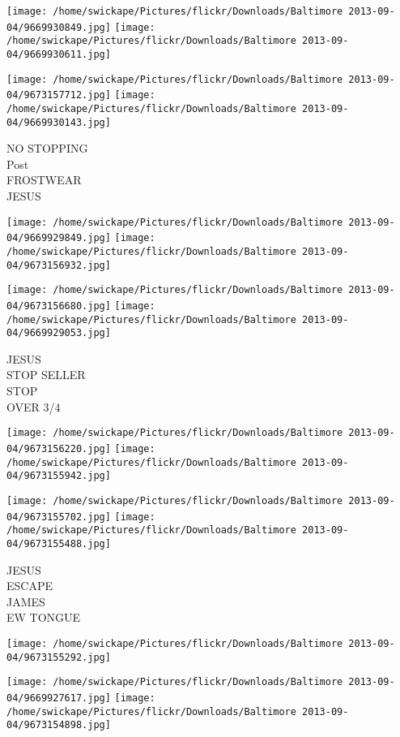 \documentclass[10pt,letterpaper]{article}
\begin{document}
\texttt{[image: /home/swickape/Pictures/flickr/Downloads/Baltimore 2013-09-04/9669930849.jpg]}
\texttt{[image: /home/swickape/Pictures/flickr/Downloads/Baltimore 2013-09-04/9669930611.jpg]}

\texttt{[image: /home/swickape/Pictures/flickr/Downloads/Baltimore 2013-09-04/9673157712.jpg]}
\texttt{[image: /home/swickape/Pictures/flickr/Downloads/Baltimore 2013-09-04/9669930143.jpg]}

NO STOPPING\\
Post\\
FROSTWEAR\\
JESUS
\pagebreak

\texttt{[image: /home/swickape/Pictures/flickr/Downloads/Baltimore 2013-09-04/9669929849.jpg]}
\texttt{[image: /home/swickape/Pictures/flickr/Downloads/Baltimore 2013-09-04/9673156932.jpg]}

\texttt{[image: /home/swickape/Pictures/flickr/Downloads/Baltimore 2013-09-04/9673156680.jpg]}
\texttt{[image: /home/swickape/Pictures/flickr/Downloads/Baltimore 2013-09-04/9669929053.jpg]}

JESUS\\
STOP SELLER\\
STOP\\
OVER 3/4
\pagebreak

\texttt{[image: /home/swickape/Pictures/flickr/Downloads/Baltimore 2013-09-04/9673156220.jpg]}
\texttt{[image: /home/swickape/Pictures/flickr/Downloads/Baltimore 2013-09-04/9673155942.jpg]}

\texttt{[image: /home/swickape/Pictures/flickr/Downloads/Baltimore 2013-09-04/9673155702.jpg]}
\texttt{[image: /home/swickape/Pictures/flickr/Downloads/Baltimore 2013-09-04/9673155488.jpg]}

JESUS\\
ESCAPE\\
JAMES\\
EW TONGUE
\pagebreak

\texttt{[image: /home/swickape/Pictures/flickr/Downloads/Baltimore 2013-09-04/9673155292.jpg]}

\vspace{0.25in}
\texttt{[image: /home/swickape/Pictures/flickr/Downloads/Baltimore 2013-09-04/9669927617.jpg]}
\texttt{[image: /home/swickape/Pictures/flickr/Downloads/Baltimore 2013-09-04/9673154898.jpg]}
\end{document}
